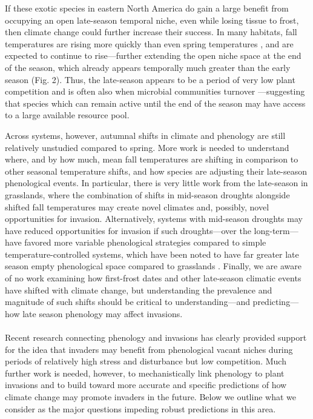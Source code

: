 \documentclass[11pt,a4paper,oneside]{article}
\begin{document}
If these exotic species in eastern North America do gain a large benefit from occupying an open late-season temporal niche, even while losing tissue to frost, then climate change could further increase their success. In many habitats, fall temperatures are rising more quickly than even spring temperatures \citep{cohen2012}, and are expected to continue to rise---further extending the open niche space at the end of the season, which already appears temporally much greater than the early season (Fig. 2). Thus, the late-season appears to be a period of very low plant competition and is often also when microbial communities turnover \citep{Bardgett:2005ls}---suggesting that species which can remain active until the end of the season may have access to a large available resource pool. 

Across systems, however, autumnal shifts in climate and phenology are still relatively unstudied compared to spring. More work is needed to understand where, and by how much, mean fall temperatures are shifting in comparison to other seasonal temperature shifts, and how species are adjusting their late-season phenological events. In particular, there is very little work from the late-season in grasslands, where the combination of shifts in mid-season droughts alongside shifted fall temperatures may create novel climates and, possibly, novel opportunities for invasion. Alternatively, systems with mid-season droughts may have reduced opportunities for invasion if such droughts---over the long-term---have favored more variable phenological strategies \citep[e.g., species flower very late to avoid stress of mid-season drought, see][]{Craine:2012eco} compared to simple temperature-controlled systems, which have been noted to have far greater late season empty phenological space compared to grasslands \citep{Craine:2012eco}. Finally, we are aware of no work examining how first-frost dates and other late-season climatic events have shifted with climate change, but understanding the prevalence and magnitude of such shifts should be critical to understanding---and predicting---how late season phenology may affect invasions. \\

\\
Recent research connecting phenology and invasions has clearly provided support for the idea that invaders may benefit from phenological vacant niches during periods of relatively high stress and disturbance but low competition. Much further work is needed, however, to mechanistically link phenology to plant invasions and to build toward more accurate and specific predictions of how climate change may promote invaders in the future. Below we outline what we consider as the major questions impeding robust predictions in this area.\\
\end{document}
